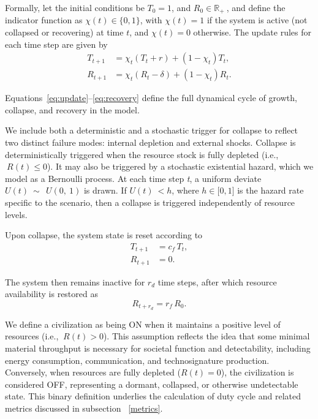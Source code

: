 Formally, let the initial conditions be \(T_{0} = 1\), and \(R_{0} \in {\mathbb{R}}_{+}\ \), and define the indicator function as \(\chi(t) \in \{ 0,1\}\), with \(\chi(t) = 1\) if the system is active (not collapsed or recovering) at time \(t\), and \(\chi(t) = 0\) otherwise. The update rules for each time step are given by
\begin{equation}
\begin{aligned}
T_{t+1} &= \chi_t \left( T_t + r \right) + \left(1 - \chi_t\right) T_t ,\\
R_{t+1} &= \chi_t \left( R_t - \delta \right) + \left(1 - \chi_t\right) R_t .
\end{aligned}
\label{eq:update}
\end{equation}

Equations~\eqref{eq:update}--\eqref{eq:recovery} define the full dynamical cycle of growth, collapse, and recovery in the model.

We include both a deterministic and a stochastic trigger for collapse to reflect two distinct failure modes: internal depletion and external shocks. Collapse is deterministically triggered when the resource stock is fully depleted (i.e.,\(\ R(t) \leq 0\)). It may also be triggered by a stochastic existential hazard, which we model as a Bernoulli process. At each time step \emph{t}, a uniform deviate \(U(t)\ \sim\ \ U(0,\ 1)\) is drawn. If \(U(t)\  < h\), where \(h \in \lbrack 0,1\rbrack\) is the hazard rate specific to the scenario, then a collapse is triggered independently of resource levels. 

Upon collapse, the system state is reset according to
\begin{equation}
\begin{aligned}
T_{t+1} &= c_f \, T_t ,\\
R_{t+1} &= 0 .
\end{aligned}
\label{eq:collapse}
\end{equation}

The system then remains inactive for $r_d$ time steps, after which resource availability is restored as
\begin{equation}
R_{t+r_d} = r_f \, R_0 .
\label{eq:recovery}
\end{equation}

We define a civilization as being ON when it maintains a positive level of resources (i.e., \(\ R(t) > 0\)). This assumption reflects the idea that some minimal material throughput is necessary for societal function and detectability, including energy consumption, communication, and technosignature production. Conversely, when resources are fully depleted (\(R(t) = 0\)), the civilization is considered OFF, representing a dormant, collapsed, or otherwise undetectable state. This binary definition underlies the calculation of duty cycle and related metrics discussed in subsection ~\ref{metrics}.

